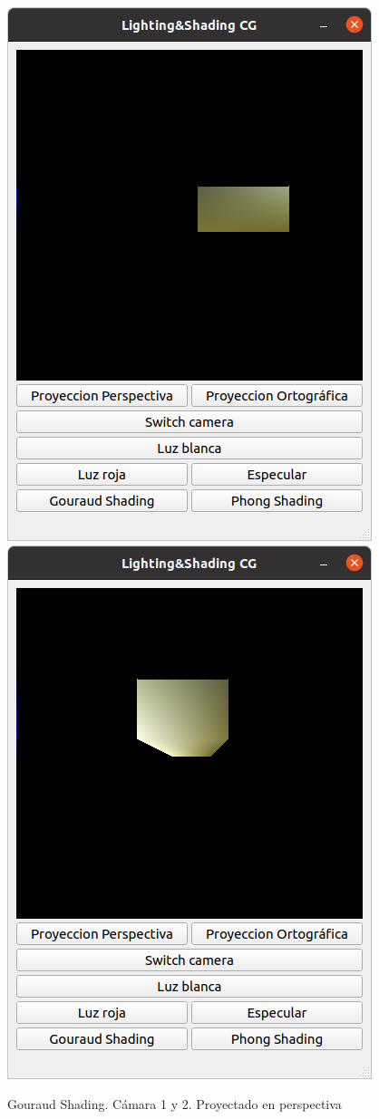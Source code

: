 \documentclass[12pt]{article}
\begin{document}
\begin{figure}[H]
\centering
\includegraphics[scale=0.5]{images/ej1.png}
\includegraphics[scale=0.5]{images/ej2.png}
\caption{Gouraud Shading. Cámara 1 y 2. Proyectado en perspectiva}
\end{figure}
\end{document}
